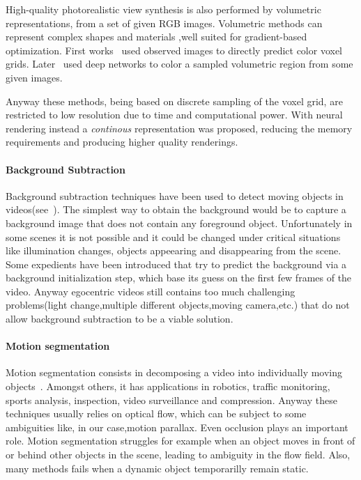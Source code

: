  High-quality photorealistic view synthesis is also performed by volumetric representations,
 from a set of given RGB images. Volumetric methods can represent complex shapes and materials
 ,well suited for gradient-based optimization. First works~\cite{nerf19} used observed images to 
 directly predict color voxel grids.
 Later~\cite{nerf9,nerf13,nerf17} used deep networks to color a sampled volumetric region from some given images.
 
 Anyway these methods, being based on discrete sampling of the voxel grid, are restricted to low resolution due to time 
 and computational power. With neural rendering instead a \textit{continous} representation was proposed, reducing 
 the memory requirements and producing higher quality renderings.
 
\paragraph{Background Subtraction}
Background subtraction techniques have been used to detect moving objects 
in videos(see~\cite{ndiff_2}). The simplest way to obtain the background would be to capture
a background image that does not contain any foreground object. Unfortunately in some scenes
it is not possible and it could be changed under critical situations like illumination
changes, objects appeearing and disappearing from the scene. Some expedients have been
introduced that try to predict the background via a background initialization step, which base
its guess on the first few frames of the video. Anyway egocentric videos still contains too much
challenging problems(light change,multiple different objects,moving camera,etc.) that do not allow background subtraction to be a viable solution.

\paragraph{Motion segmentation}
Motion segmentation consists in decomposing a video into individually moving 
objects~\cite{ndiff_18}. Amongst others, it has applications in 
robotics, traffic monitoring, sports analysis, inspection, video surveillance and compression.
Anyway these techniques usually relies on optical flow, which can be subject to some ambiguities
like, in our case,motion parallax. Even occlusion plays an important role. Motion segmentation
struggles for example when an object moves in front of or behind other objects in the 
scene, leading to ambiguity in the flow field. Also, many methods fails when a dynamic 
object temporarilly remain static.

